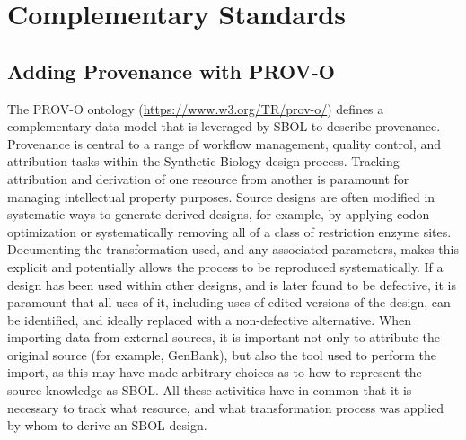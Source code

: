 \section{Complementary Standards}
\label{sec:complementaryStandards}
\subsection{Adding Provenance with PROV-O}
\label{sec:provenance}
\label{sec:wasGeneratedBys}

The PROV-O ontology (\url{https://www.w3.org/TR/prov-o/}) defines a complementary data model that is leveraged by SBOL to describe provenance. Provenance is central to a range of workflow management, quality control, and attribution tasks within the Synthetic Biology design process. Tracking attribution and derivation of one resource from another is paramount for managing intellectual property purposes. Source designs are often modified in systematic ways to generate derived designs, for example, by applying codon optimization or systematically removing all of a class of restriction enzyme sites.  Documenting the transformation used, and any associated parameters, makes this explicit and potentially allows the process to be reproduced systematically. If a design has been used within other designs, and is later found to be defective, it is paramount that all uses of it, including uses of edited versions of the design, can be identified, and ideally replaced with a non-defective alternative. When importing data from external sources, it is important not only to attribute the original source (for example, GenBank), but also the tool used to perform the import, as this may have made arbitrary choices as to how to represent the source knowledge as SBOL. All these activities have in common that it is necessary to track what resource, and what transformation process was applied by whom to derive an SBOL design.

